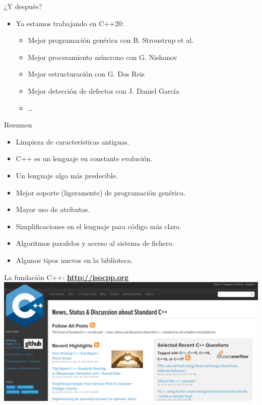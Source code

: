 \begin{frame}[t]{¿Y después?}
\begin{itemize}
  \item Ya estamos trabajando en C++20:
    \begin{itemize}
      \item Mejor programación genérica con  {B. Stroustrup et al.}
      \item Mejor procesamiento asíncrono con  {G. Nishanov}
      \item Mejor estructuración con  {G. Dos Reis}
      \item Mejor detección de defectos con  {J. Daniel García}
      \item \ldots
    \end{itemize}
\end{itemize}
\end{frame}

\begin{frame}[t]{Resumen}
\begin{itemize}[<+->]
  \item Limpieza de características antiguas.
  \item C++ es un lenguaje en constante evolución.
  \item Un lenguaje algo más predecible.
  \item Mejor soporte (ligeramente) de programación genérica.
  \item Mayor uso de atributos.
  \item Simplificaciones en el lenguaje para código más claro.
  \item Algoritmos paralelos y acceso al sistema de fichero.
  \item Algunos tipos nuevos en la biblioteca.
\end{itemize}
\end{frame}

\begin{frame}[t]{La fundación C++: \textbf{\url{http://isocpp.org}}}
\includegraphics[width=\textwidth]{../img/isocpp.png}
\end{frame}
